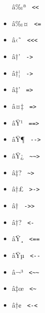 \begin{itemize}
  \label{symbol-lt.double}{{ â‰ª }
  \texttt{\ \textless{}\textless{}\ }}
\item
  \label{symbol-lt.eq}{{ â‰¤ } \texttt{\ \textless{}=\ }}
\item
  \label{symbol-lt.triple}{{ â‹˜ }
  \texttt{\ \textless{}\textless{}\textless{}\ }}
\item
  \label{symbol-arrow.r}{{ â†' }
  \texttt{\ -\textgreater{}\ }}
\item
  \label{symbol-arrow.r.bar}{{ â†¦ }
  \texttt{\ \textbar{}-\textgreater{}\ }}
\item
  \label{symbol-arrow.r.double}{{ â‡' }
  \texttt{\ =\textgreater{}\ }}
\item
  \label{symbol-arrow.r.double.bar}{{ â¤‡ }
  \texttt{\ \textbar{}=\textgreater{}\ }}
\item
  \label{symbol-arrow.r.double.long}{{ âŸ¹ }
  \texttt{\ ==\textgreater{}\ }}
\item
  \label{symbol-arrow.r.long}{{ âŸ¶ }
  \texttt{\ -\/-\textgreater{}\ }}
\item
  \label{symbol-arrow.r.long.squiggly}{{ âŸ¿ }
  \texttt{\ \textasciitilde{}\textasciitilde{}\textgreater{}\ }}
\item
  \label{symbol-arrow.r.squiggly}{{ â‡? }
  \texttt{\ \textasciitilde{}\textgreater{}\ }}
\item
  \label{symbol-arrow.r.tail}{{ â†£ }
  \texttt{\ \textgreater{}-\textgreater{}\ }}
\item
  \label{symbol-arrow.r.twohead}{{ â† }
  \texttt{\ -\textgreater{}\textgreater{}\ }}
\item
  \label{symbol-arrow.l}{{ â†? }
  \texttt{\ \textless{}-\ }}
\item
  \label{symbol-arrow.l.double.long}{{ âŸ¸ }
  \texttt{\ \textless{}==\ }}
\item
  \label{symbol-arrow.l.long}{{ âŸµ }
  \texttt{\ \textless{}-\/-\ }}
\item
  \label{symbol-arrow.l.long.squiggly}{{ â¬³ }
  \texttt{\ \textless{}\textasciitilde{}\textasciitilde{}\ }}
\item
  \label{symbol-arrow.l.squiggly}{{ â‡œ }
  \texttt{\ \textless{}\textasciitilde{}\ }}
\item
  \label{symbol-arrow.l.tail}{{ â†¢ }
  \texttt{\ \textless{}-\textless{}\ }}

\end{itemize}
